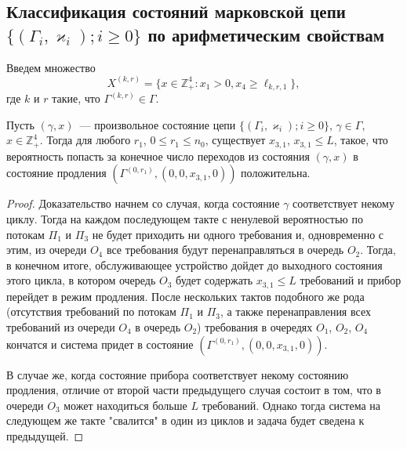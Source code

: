 \documentclass[a4paper,12pt,russian]{extarticle}
\newcommand{\ga}[1]{\Gamma^{\left( #1 \right)} }
\newcommand{\Mark}{\{(\Gamma_i, \varkappa_i); i \geqslant 0\}}
\begin{document}
\subsection{Классификация состояний марковской цепи $\Mark$ по арифметическим свойствам}
Введем множество 
\begin{equation*}
X^{(k,r)} = \{x \in \mathbb{Z}_+^4 \colon x_1 > 0, x_4 \geqslant \ell_{k,r,1}\},
\end{equation*}
где $k$ и $r$ такие, что $\ga{k,r}\in \Gamma$. 

\begin{lemma}
Пусть $(\gamma,x)$~--- произвольное состояние цепи $\Mark$, $\gamma\in \Gamma$, $x \in \mathbb{Z}_+^4$. Тогда для любого $r_1$, $0\leqslant r_1 \leqslant n_0$, существует $x_{3,1}$, $x_{3,1} \leqslant L$, такое, что вероятность попасть за конечное число переходов из состояния $(\gamma,x)$ в состояние продления $(\ga{0,r_1}, (0,0,x_{3,1},0))$ положительна.
\label{lemma:1}
\end{lemma}
\begin{proof}
Доказательство начнем со случая, когда состояние $\gamma$ соответствует некому циклу. Тогда на каждом последующем такте с ненулевой вероятностью по потокам $\Pi_1$ и $\Pi_3$ не будет приходить ни одного требования и, одновременно с этим, из очереди $O_4$ все требования будут перенаправляться в очередь $O_2$. Тогда, в конечном итоге, обслуживающее устройство дойдет до выходного состояния этого цикла, в котором очередь $O_3$ будет содержать $x_{3,1} \leqslant L$ требований и прибор перейдет в режим продления. После нескольких тактов подобного же рода (отсутствия требований по потокам $\Pi_1$ и $\Pi_3$, а также перенаправления всех требований из очереди $O_4$ в очередь $O_2$) требования в очередях $O_1$, $O_2$, $O_4$ кончатся и система придет в состояние $(\ga{0,r_1}, (0,0,x_{3,1},0))$.

В случае же, когда состояние прибора соответствует некому состоянию продления, отличие от второй части предыдущего случая состоит в том, что в очереди $O_3$ может находиться больше $L$ требований. Однако тогда система на следующем же такте "свалится" в один из циклов и задача будет сведена к предыдущей. 
\end{proof}
\end{document}
